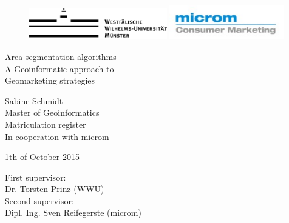 
\thispagestyle{empty}

	
		\begin{center}
			
						\begin{figure}[htbp]
						\begin{minipage}[b][1cm]{0.6\textwidth}
						\includegraphics[width=6cm]{images/WWU_Logo1_1c}
						\end{minipage}
						\hfill
						\begin{minipage}[b][1cm]{0.3\textwidth}
						\includegraphics[width=5cm]{images/microm.jpg}
						\end{minipage}
						\end{figure}
			
				\par
				\vspace*{14ex}
		\Huge
					Area segmentation algorithms - \\
					A Geoinformatic approach to \\
					Geomarketing strategies\\
				\par
		\normalsize
		\large
					 
			
				\vspace*{15ex}
					Sabine Schmidt\\
					Master of Geoinformatics\\
					Matriculation register\\
					In cooperation with microm
					
					1th of October 2015
				\par
			\end{center}
			
			\vspace*{25ex}
			First supervisor:\\
			Dr. Torsten Prinz (WWU)\\
			Second supervisor:\\
			Dipl. Ing. Sven Reifegerste (microm)